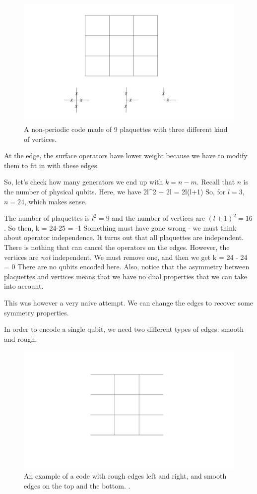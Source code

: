\begin{figure}[h]
\centering
\includegraphics[width= \textwidth]{./PlanarCode.jpg}
\caption{A non-periodic code made of 9 plaquettes with three different kind of vertices.}
\end{figure}

At the edge, the surface operators have lower weight because we have to modify them to fit in with these edges. 

So, let's check how many generators we end up with $k = n-m$. Recall that $n$ is the number of physical qubits. Here, we have
\beq
2l^2 + 2l = 2l(l+1)
\eeq
So, for $l = 3$, $n = 24$, which makes sense. 

The number of plaquettes is $l^2 = 9$ and the number of vertices are $(l+1)^2 = 16$. So then, 
\beq
k = 24-25 = -1
\eeq
Something must have gone wrong - we must think about operator independence. It turns out that all plaquettes are independent. There is nothing that can cancel the operators on the edges. However, the vertices are \emph{not} independent. We must remove one, and then we get
\beq
k = 24 - 24 = 0
\eeq
There are no qubits encoded here. Also, notice that the asymmetry between plaquettes and vertices means that we have no dual properties that we can take into account. 

This was however a very naive attempt. We can change the edges to recover some symmetry properties. 

In order to encode a single qubit, we need two different types of edges: smooth and rough. 


\begin{figure}[h]
\centering
\includegraphics[width= \textwidth]{./Borders.jpg}
\caption{An example of a code with rough edges left and right, and smooth edges on the top and the bottom. .}
\end{figure}

